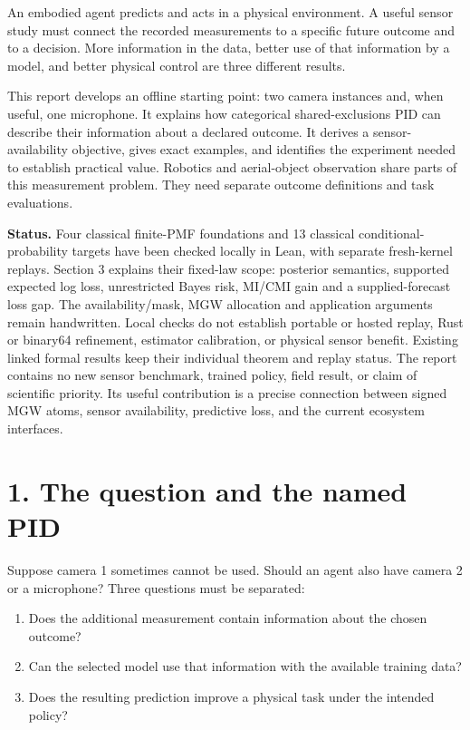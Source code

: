 \documentclass[11pt,a4paper]{article}
\title{\PidReportTitle{Sensor information for embodied agents}{Categorical shared exclusions, availability and predictive utility}}
\author{Sepehr Mahmoudian}
\date{23 September 2026}
\providecommand{\tightlist}{\setlength{\itemsep}{0pt}\setlength{\parskip}{0pt}}
\begin{document}
\RaggedRight
\PidMakeTitle
An embodied agent predicts and acts in a physical environment. A useful sensor study must connect the recorded measurements to a specific future outcome and to a decision. More information in the data, better use of that information by a model, and better physical control are three different results.

This report develops an offline starting point: two camera instances and, when useful, one microphone. It explains how categorical shared-exclusions PID can describe their information about a declared outcome. It derives a sensor-availability objective, gives exact examples, and identifies the experiment needed to establish practical value. Robotics and aerial-object observation share parts of this measurement problem. They need separate outcome definitions and task evaluations.

\textbf{Status.} Four classical finite-PMF foundations and 13 classical conditional-probability targets have been checked locally in Lean, with separate fresh-kernel replays. Section 3 explains their fixed-law scope: posterior semantics, supported expected log loss, unrestricted Bayes risk, MI/CMI gain and a supplied-forecast loss gap. The availability/mask, MGW allocation and application arguments remain handwritten. Local checks do not establish portable or hosted replay, Rust or binary64 refinement, estimator calibration, or physical sensor benefit. Existing linked formal results keep their individual theorem and replay status. The report contains no new sensor benchmark, trained policy, field result, or claim of scientific priority. Its useful contribution is a precise connection between signed MGW atoms, sensor availability, predictive loss, and the current ecosystem interfaces.

\par{}

\section{1. The question and the named PID}\label{the-question-and-the-named-pid}

Suppose camera 1 sometimes cannot be used. Should an agent also have camera 2 or a microphone? Three questions must be separated:

\begin{enumerate}
\def\labelenumi{\arabic{enumi}.}
\tightlist
\item
  Does the additional measurement contain information about the chosen outcome?
\item
  Can the selected model use that information with the available training data?
\item
  Does the resulting prediction improve a physical task under the intended policy?
\end{enumerate}
\end{document}
